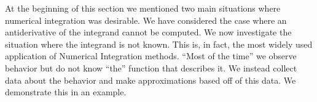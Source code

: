 At the beginning of this section we mentioned two main situations where numerical integration was desirable. We have considered the case where an antiderivative of the integrand cannot be computed. We now investigate the situation where the integrand is not known. This is, in fact, the most widely used application of Numerical Integration methods. ``Most of the time'' we observe behavior but do not know ``the'' function that describes it. We instead collect data about the behavior and make approximations based off of this data. We demonstrate this in an example.\\

